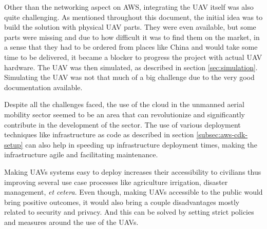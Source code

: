 Other than the networking aspect on AWS, integrating the UAV itself  was also quite challenging. As mentioned throughout this document, the initial idea was to build the solution with physical UAV parts. They were even available, but some parts were missing and due to how difficult it was to find them on the market, in a sense that they had to be ordered from places like China and would take some time to be delivered, it became a blocker to progress the project with actual UAV hardware. The UAV was then simulated, as described in section \ref{sec:simulation}. Simulating the UAV was not that much of a big challenge due to the very good documentation available.

Despite all the challenges faced, the use of the cloud in the unmanned aerial mobility sector seemed to be an area that can revolutionize and significantly contribute in the development of the sector. The use of various deployment techniques like infrastructure as code as described in section \ref{subsec:aws-cdk-setup} can also help in speeding up infrastructure deployment times, making the infrastructure agile and facilitating maintenance.

Making UAVs systems easy to deploy increases their accessibility to civilians thus improving several use case processes like agriculture irrigation, disaster management, \textit{et cetera}. Even though, making UAVs accessible to the public would bring positive outcomes, it would also bring a couple disadvantages mostly related to security and privacy. And this can be solved by setting strict policies and measures around the use of the UAVs.